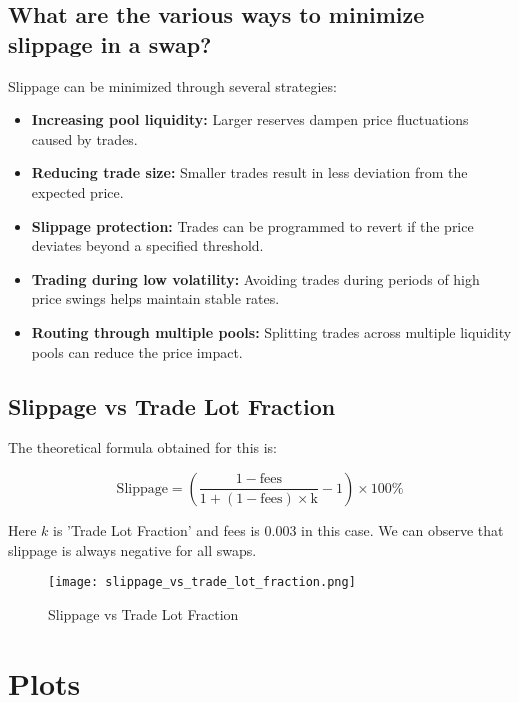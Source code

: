 \documentclass[12pt,a4paper]{article}
\begin{document}
\subsection*{What are the various ways to minimize slippage in a swap?}

Slippage can be minimized through several strategies:

\begin{itemize}
    \item \textbf{Increasing pool liquidity:} Larger reserves dampen price fluctuations caused by trades.
    \item \textbf{Reducing trade size:} Smaller trades result in less deviation from the expected price.
    \item \textbf{Slippage protection:} Trades can be programmed to revert if the price deviates beyond a specified threshold.
    \item \textbf{Trading during low volatility:} Avoiding trades during periods of high price swings helps maintain stable rates.
    \item \textbf{Routing through multiple pools:} Splitting trades across multiple liquidity pools can reduce the price impact.
\end{itemize}

\subsection*{Slippage vs Trade Lot Fraction}

The theoretical formula obtained for this is:

\begin{equation}
    \label{eq:slippage_formula}
    \text{Slippage} = \left( \frac{1 - \text{fees}}{1 + (1 - \text{fees}) \times \text{k}} - 1 \right) \times 100 \%
\end{equation}

Here $k$ is 'Trade Lot Fraction' and fees is 0.003 in this case. We can observe that slippage is always negative for all swaps.

\begin{figure}[H]
    \centering
    \texttt{[image: slippage\_vs\_trade\_lot\_fraction.png]}
    \caption{Slippage vs Trade Lot Fraction}
    \label{fig:slippage_vs_trade_lot_fraction}
\end{figure}

\newpage
\section*{Plots}
\end{document}
